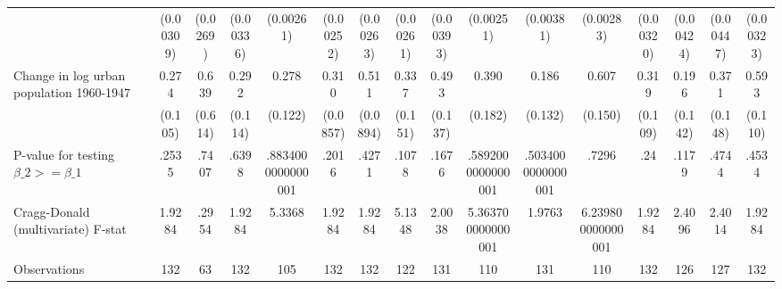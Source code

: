 {\begin{tabular}{l*{15}{c}}
                &(0.00309)         & (0.0269)         &(0.00336)         &(0.00261)         &(0.00252)         &(0.00263)         &(0.00261)         &(0.00393)         &(0.00251)         &(0.00381)         &(0.00283)         &(0.00320)         &(0.00424)         &(0.00447)         &(0.00323)         \\
[1em]
Change in log urban population 1960-1947&    0.274\sym{**} &    0.639         &    0.292\sym{**} &    0.278\sym{**} &    0.310\sym{***}&    0.511\sym{***}&    0.337\sym{**} &    0.493\sym{***}&    0.390\sym{**} &    0.186         &    0.607\sym{***}&    0.319\sym{***}&    0.196         &    0.371\sym{**} &    0.593\sym{***}\\
                &  (0.105)         &  (0.614)         &  (0.114)         &  (0.122)         & (0.0857)         & (0.0894)         &  (0.151)         &  (0.137)         &  (0.182)         &  (0.132)         &  (0.150)         &  (0.109)         &  (0.142)         &  (0.148)         &  (0.110)         \\
\hline
P-value for testing $\beta\_{2} >= \beta\_{1}$&    .2535         &    .7407         &    .6398         &.8834000000000001         &    .2016         &    .4271         &    .1078         &    .1676         &.5892000000000001         &.5034000000000001         &    .7296         &      .24         &    .1179         &    .4744         &    .4534         \\
Cragg-Donald (multivariate) F-stat&   1.9284         &    .2954         &   1.9284         &   5.3368         &   1.9284         &   1.9284         &   5.1348         &   2.0038         &5.363700000000001         &   1.9763         &6.239800000000001         &   1.9284         &   2.4096         &   2.4014         &   1.9284         \\
Observations    &      132         &       63         &      132         &      105         &      132         &      132         &      122         &      131         &      110         &      131         &      110         &      132         &      126         &      127         &      132         \\
\hline\hline
\end{tabular}
}
